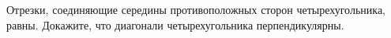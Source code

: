 \begin{ex}
	\begin{condition}
		Отрезки, соединяющие середины противоположных сторон четырехугольника, равны. Докажите, что диагонали четырехугольника перпендикулярны.
	\end{condition}
\end{ex}